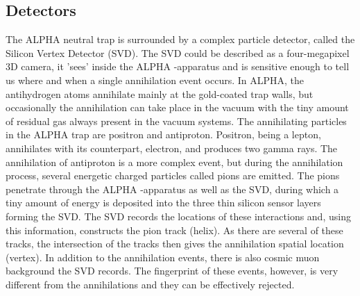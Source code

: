 \documentclass[12pt,a4paper]{article}
\begin{document}
\subsection{Detectors}
The ALPHA neutral trap is surrounded by a complex particle detector, called the Silicon Vertex Detector (SVD). The SVD could be described as a four-megapixel 3D camera, it 'sees' inside the ALPHA -apparatus and is sensitive enough to tell us where and when a single annihilation event occurs. In ALPHA, the antihydrogen atoms annihilate mainly at the gold-coated trap walls, but occasionally the annihilation can take place in the vacuum with the tiny amount of residual gas always present in the vacuum systems. The annihilating particles in the ALPHA trap are positron and antiproton. Positron, being a lepton, annihilates with its counterpart, electron, and produces two gamma rays. The annihilation of antiproton is a more complex event, but during the annihilation process, several energetic charged particles called pions are emitted. The pions penetrate through the ALPHA -apparatus as well as the SVD, during which a tiny amount of energy is deposited into the three thin silicon sensor layers forming the SVD. The SVD records the locations of these interactions and, using this information, constructs the pion track (helix). As there are several of these tracks, the intersection of the tracks then gives the annihilation spatial location (vertex). In addition to the annihilation events, there is also cosmic muon background the SVD records. The fingerprint of these events, however, is very different from the annihilations and they can be effectively rejected.
\end{document}
